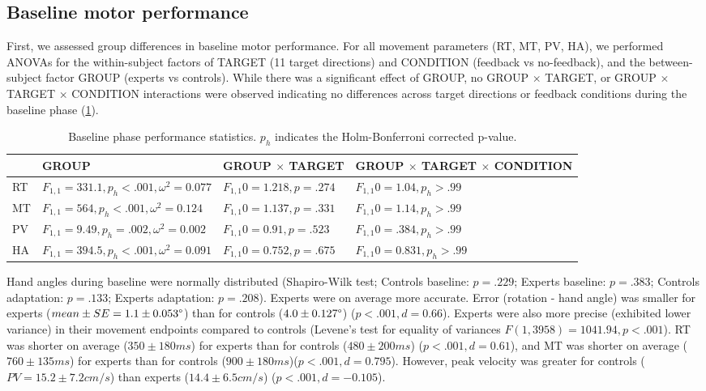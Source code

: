 \documentclass[jou, 11pt, longtable, floatsintext, notab]{apa6}
\begin{document}
\subsection{Baseline motor performance}
First, we assessed group differences in baseline motor
performance. For all movement parameters (RT, MT, PV, HA),
we performed ANOVAs for the within-subject factors of TARGET
(11 target directions) and CONDITION (feedback vs
no-feedback), and the between-subject factor GROUP (experts
vs controls). While there was a significant effect of GROUP,
no GROUP $\times$ TARGET, or GROUP $\times$ TARGET $\times$
CONDITION interactions were observed indicating no
differences across target directions or feedback conditions
during the baseline phase (\ref{table_1}).
\begin{table}[t]
  \centering
  \footnotesize
  \begin{tabular}{ l|l|l|l } 
    & GROUP & GROUP $\times$ TARGET & GROUP $\times$ TARGET $\times$ CONDITION \\
    \hline
    RT & $F_{1,1}=331.1,  p_{h} <.001, \omega^2 = 0.077$ & $F_{1,1}0=1.218, p=.274$ & $F_{1,1}0=1.04, p_{h}>.99$\\ 
    MT & $F_{1,1} = 564, p_{h} <.001, \omega^2 = 0.124$ & $F_{1,1}0=1.137, p=.331$ & $F_{1,1}0=1.14, p_{h} >.99$\\  
    PV & $F_{1,1} = 9.49, p_{h} =.002, \omega^2 = 0.002$ & $F_{1,1}0=0.91, p=.523$ & $F_{1,1}0=.384, p_{h} >.99$\\ 
    HA & $F_{1,1}=394.5, p_{h} <.001, \omega^2 = 0.091$ & $F_{1,1}0=0.752, p=.675$ & $F_{1,1}0=0.831, p_{h} >.99$\\
  \end{tabular}
  \caption{Baseline phase performance statistics. $p_{h}$ indicates 
  the Holm-Bonferroni corrected p-value.}
  \label{table_1}
\end{table}

Hand angles during baseline were normally distributed
(Shapiro-Wilk test; Controls baseline: $p=.229$; Experts
baseline: $p=.383$; Controls adaptation: $p=.133$; Experts
adaptation: $p=.208$). Experts were on average more
accurate. Error (rotation - hand angle) was smaller for
experts ($mean \pm SE = 1.1 \pm 0.053\degree$) than for
controls ($4.0\pm0.127\degree$) ($p<.001, d = 0.66$).
Experts were also more precise (exhibited lower variance) in
their movement endpoints compared to controls (Levene's test
for equality of variances $F(1, 3958) = 1041.94, p < .001$).
RT was shorter on average ($350 \pm 180ms$) for experts than
for controls ($480 \pm 200ms$) ($p<.001, d = 0.61$), and MT
was shorter on average ($760 \pm 135ms$) for experts than
for controls ($900 \pm 180ms$)($p<.001, d= 0.795$). However,
peak velocity was greater for controls ($PV = 15.2\pm7.2
cm/s$) than experts ($14.4\pm6.5 cm/s$) ($p<.001, d =-
0.105$).
\end{document}
